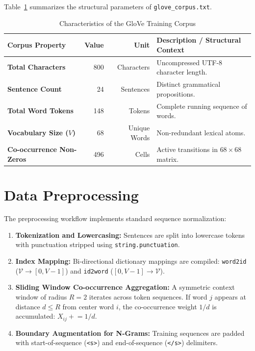 \documentclass[12pt,a4paper]{report}
\begin{document}
Table~\ref{tab:exp6_corpus_stats} summarizes the structural parameters of \texttt{glove\_corpus.txt}.
\begin{table}[H]
\centering
\small
\caption{Characteristics of the GloVe Training Corpus}
\label{tab:exp6_corpus_stats}
\begin{tabular}{lrrp{7.5cm}}
\toprule
\textbf{Corpus Property} & \textbf{Value} & \textbf{Unit} & \textbf{Description / Structural Context} \\
\midrule
\textbf{Total Characters} & 800 & Characters & Uncompressed UTF-8 character length. \\
\textbf{Sentence Count} & 24 & Sentences & Distinct grammatical propositions. \\
\textbf{Total Word Tokens} & 148 & Tokens & Complete running sequence of words. \\
\textbf{Vocabulary Size ($V$)} & 68 & Unique Words & Non-redundant lexical atoms. \\
\textbf{Co-occurrence Non-Zeros} & 496 & Cells & Active transitions in $68 \times 68$ matrix. \\
\bottomrule
\end{tabular}
\end{table}

\section{Data Preprocessing}
The preprocessing workflow implements standard sequence normalization:
\begin{enumerate}
    \item \textbf{Tokenization and Lowercasing:} Sentences are split into lowercase tokens with punctuation stripped using \texttt{string.punctuation}.
    \item \textbf{Index Mapping:} Bi-directional dictionary mappings are compiled: \texttt{word2id} ($\mathcal{V} \to [0, V-1]$) and \texttt{id2word} ($[0, V-1] \to \mathcal{V}$).
    \item \textbf{Sliding Window Co-occurrence Aggregation:} A symmetric context window of radius $R = 2$ iterates across token sequences. If word $j$ appears at distance $d \le R$ from center word $i$, the co-occurrence weight $1/d$ is accumulated: $X_{ij} \mathrel{+}= 1/d$.
    \item \textbf{Boundary Augmentation for N-Grams:} Training sequences are padded with start-of-sequence (\texttt{<s>}) and end-of-sequence (\texttt{</s>}) delimiters.
\end{enumerate}
\end{document}
